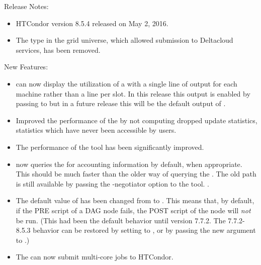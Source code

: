 \noindent Release Notes:

\begin{itemize}

\item HTCondor version 8.5.4 released on May 2, 2016.

\item The  type in the grid universe, which allowed
submission to Deltacloud services, has been removed.

\end{itemize}


\noindent New Features:

\begin{itemize}

\item {} can now display the utilization of a  with
a single line of output for each machine rather than a line per slot.
In this release this output is enabled by passing  to 
but in a future release this will be the default output of .

\item Improved the performance of the  by
not computing dropped update statistics, statistics which 
have never been accessible by users.

\item The performance of the  tool has been
significantly improved.

\item {} now queries the  for 
accounting information by default, when appropriate.  This should be
much faster than the older way of querying the . The
old path is still available by passing the -negotiator option to the
tool.
.

\item The default value of  has been
changed from  to .  This means that, by
default, if the PRE script of a DAG node fails, the POST script
of the node will \emph{not} be run.  (This had been the default
behavior until version 7.7.2.  The 7.7.2-8.5.3 behavior can be
restored by setting  to 
, or by passing the new 
argument to .)

\item The  can now submit multi-core jobs to HTCondor.


\end{itemize}
